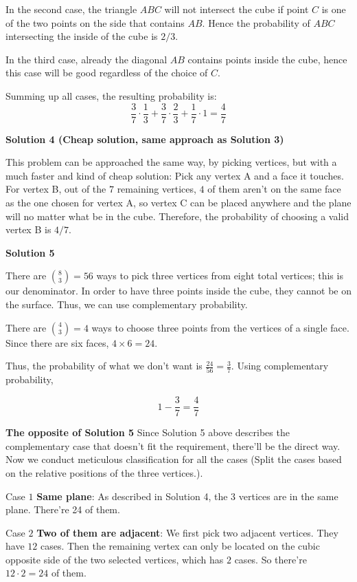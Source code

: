 \begin{enumerate}
 In the second case, the triangle $ABC$ will not intersect the cube if point $C$ is one of the two points on the side that contains $AB$. Hence the probability of $ABC$ intersecting the inside of the cube is $2/3$.

 In the third case, already the diagonal $AB$ contains points inside the cube, hence this case will be good regardless of the choice of $C$.

 Summing up all cases, the resulting probability is:
 \[\frac 37\cdot\frac 13 + \frac 37\cdot \frac 23 + \frac 17\cdot 1 = \boxed{\frac 47}\]




\textbf{Solution 4 (Cheap solution, same approach as Solution 3)}

This problem can be approached the same way, by picking vertices, but with a much faster and kind of cheap solution: Pick any vertex A and a face it touches. For vertex B, out of the $7$ remaining vertices, $4$ of them aren't on the same face as the one chosen for vertex A, so vertex C can be placed anywhere and the plane will no matter what be in the cube. Therefore, the probability of choosing a valid vertex B is $4/7$.

 



\textbf{Solution 5}

There are $\binom{8}{3}=56$ ways to pick three vertices from eight total vertices; this is our denominator. In order to have three points inside the cube, they cannot be on the surface. Thus, we can use complementary probability.

 There are $\binom{4}{3}=4$ ways to choose three points from the vertices of a single face. Since there are six faces, $4 \times 6 = 24$.

 Thus, the probability of what we don't want is $\frac{24}{56} = \frac{3}{7}$. Using complementary probability, 

 
 \[1- \frac 37 = \boxed{\frac 47}\]

 \textbf{The opposite of Solution 5} Since Solution 5 above describes the complementary case that doesn't fit the requirement, there'll be the direct way. Now we conduct meticulous classification for all the cases (Split the cases based on the relative positions of the three vertices.).

 Case $1$ \textbf{Same plane}: As described in Solution 4, the 3 vertices are in the same plane. There're 24 of them.

 Case $2$ \textbf{Two of them are adjacent}: We first pick two adjacent vertices. They have $12$ cases. Then the remaining vertex can only be located on the cubic opposite side of the two selected vertices, which has $2$ cases. So there're $12 \cdot 2=24$ of them.


\end{enumerate}
